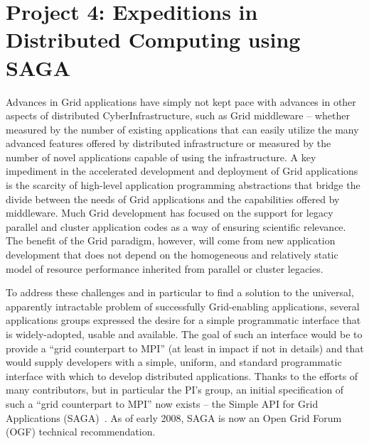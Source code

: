 \documentclass[a4paper,10pt]{article}
\begin{document}
\section*{Project 4: Expeditions in Distributed Computing using SAGA}



Advances in Grid applications have simply not kept pace with advances in other aspects of distributed CyberInfrastructure, such as Grid middleware -- whether measured by the number of existing applications that can easily utilize the many advanced features offered by distributed infrastructure or measured by the number of novel applications capable of using the infrastructure. A key impediment in the accelerated development and deployment of Grid applications is the scarcity of high-level application programming abstractions that bridge the divide between the needs of Grid applications and the capabilities offered by middleware.  Much Grid development has focused on the support for legacy parallel and cluster application codes as a way of ensuring scientific relevance.  The benefit of the Grid paradigm, however, will come from new application development that does not depend on the homogeneous and relatively static model of resource performance inherited from parallel or cluster legacies.  %

To address these challenges and in particular to find a solution to the universal, apparently intractable problem of successfully Grid-enabling applications, several applications groups expressed the desire for a simple programmatic interface that is widely-adopted, usable and available.  The goal of such an interface would be to provide a ``grid counterpart to MPI'' (at least in impact if not in details) and that would supply developers with a simple, uniform, and standard programmatic interface with which to develop distributed applications.  Thanks to the efforts of many contributors, but in particular the PI's group, an initial specification of such a ``grid counterpart to MPI'' now exists -- the Simple API for Grid Applications (SAGA)~\cite{saga_url}. As of early 2008, SAGA is now an Open Grid Forum (OGF) technical recommendation.
\end{document}
